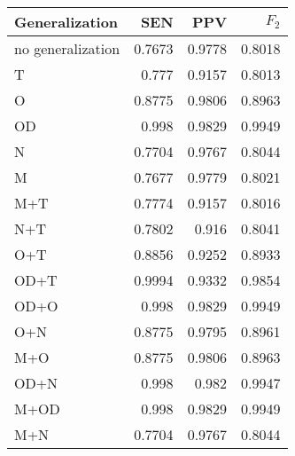 \begin{table}[htbp]
  \caption{}
  \label{tab:}
  \centering
  \begin{tabular}[h]{@{}lrrr@{}}
    \toprule
    Generalization & SEN & PPV & \(F_2\) \\
    \midrule
no generalization	&	0.7673	&	0.9778	&	0.8018 \\
T	&	0.777	&	0.9157	&	0.8013 \\
O	&	0.8775	&	0.9806	&	0.8963 \\
OD	&	0.998	&	0.9829	&	0.9949 \\
N	&	0.7704	&	0.9767	&	0.8044 \\
M	&	0.7677	&	0.9779	&	0.8021 \\
M+T	&	0.7774	&	0.9157	&	0.8016 \\
N+T	&	0.7802	&	0.916	&	0.8041 \\
O+T	&	0.8856	&	0.9252	&	0.8933 \\
OD+T	&	0.9994	&	0.9332	&	0.9854 \\
OD+O	&	0.998	&	0.9829	&	0.9949 \\
O+N	&	0.8775	&	0.9795	&	0.8961 \\
M+O	&	0.8775	&	0.9806	&	0.8963 \\
OD+N	&	0.998	&	0.982	&	0.9947 \\
M+OD	&	0.998	&	0.9829	&	0.9949 \\
M+N	&	0.7704	&	0.9767	&	0.8044 \\
    \bottomrule
  \end{tabular}
\end{table}
